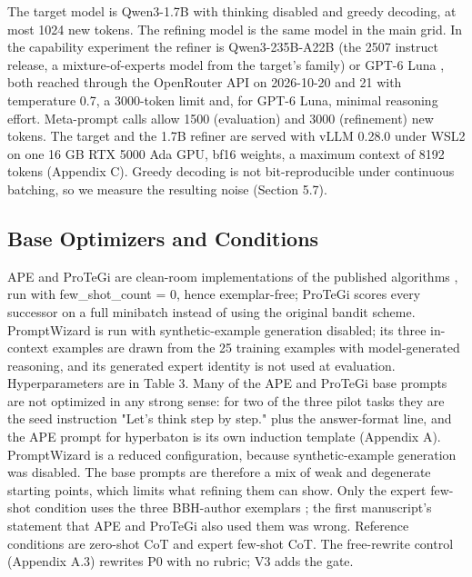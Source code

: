 \documentclass{ieeeaccess}
\begin{document}
The target model is Qwen3-1.7B \cite{qwenteam2025} with thinking disabled and greedy decoding, at most 1024 new tokens. The refining model is the same model in the main grid. In the capability experiment the refiner is Qwen3-235B-A22B (the 2507 instruct release, a mixture-of-experts model from the target's family) or GPT-6 Luna \cite{luna2026}, both reached through the OpenRouter API on 2026-10-20 and 21 with temperature 0.7, a 3000-token limit and, for GPT-6 Luna, minimal reasoning effort. Meta-prompt calls allow 1500 (evaluation) and 3000 (refinement) new tokens. The target and the 1.7B refiner are served with vLLM \cite{kwon2023} 0.28.0 under WSL2 on one 16 GB RTX 5000 Ada GPU, bf16 weights, a maximum context of 8192 tokens (Appendix C). Greedy decoding is not bit-reproducible under continuous batching, so we measure the resulting noise (Section 5.7).

\subsection{Base Optimizers and Conditions}

APE and ProTeGi are clean-room implementations of the published algorithms \cite{zhou2023,pryzant2023}, run with few\_\allowbreak{}shot\_\allowbreak{}count = 0, hence exemplar-free; ProTeGi scores every successor on a full minibatch instead of using the original bandit scheme. PromptWizard \cite{agarwal2025} is run with synthetic-example generation disabled; its three in-context examples are drawn from the 25 training examples with model-generated reasoning, and its generated expert identity is not used at evaluation. Hyperparameters are in Table 3. Many of the APE and ProTeGi base prompts are not optimized in any strong sense: for two of the three pilot tasks they are the seed instruction "Let's think step by step." plus the answer-format line, and the APE prompt for hyperbaton is its own induction template (Appendix A). PromptWizard is a reduced configuration, because synthetic-example generation was disabled. The base prompts are therefore a mix of weak and degenerate starting points, which limits what refining them can show. Only the expert few-shot condition uses the three BBH-author exemplars \cite{suzgun2023}; the first manuscript's statement that APE and ProTeGi also used them was wrong. Reference conditions are zero-shot CoT \cite{kojima2022} and expert few-shot CoT. The free-rewrite control (Appendix A.3) rewrites P0 with no rubric; V3 adds the gate.
\end{document}
